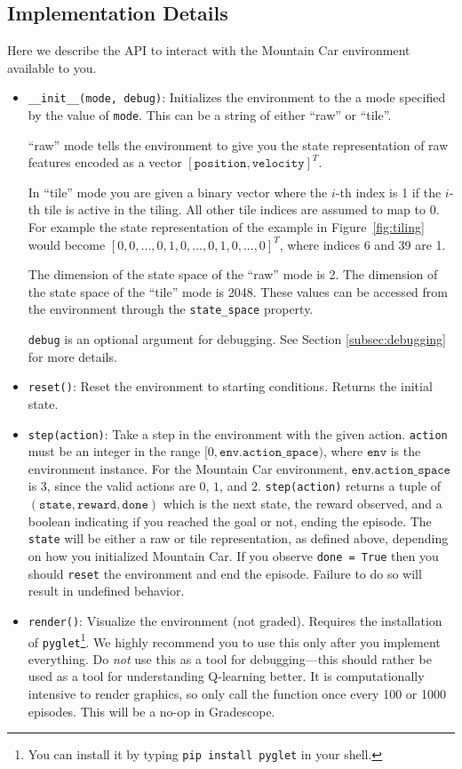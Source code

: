 \documentclass[11pt,addpoints,answers]{exam}
\begin{document}
\subsection{Implementation Details}
Here we describe the API to interact with the Mountain Car environment available to you.

\begin{itemize}
    \item \texttt{\_\_init\_\_(mode, debug)}: Initializes the environment to the a mode specified by the value of \texttt{mode}. This can be a string of either ``raw'' or ``tile''. 
    
    ``raw'' mode tells the environment to give you the state representation of raw features encoded as a vector $[\texttt{position}, \texttt{velocity}]^T$.
    
    In ``tile'' mode you are given a binary vector where the $i$-th index is 1 if the $i$-th tile is active in the tiling. All other tile indices are assumed to map to 0. For example the state representation of the example in Figure~\ref{fig:tiling} would become $[0, 0, ..., 0, 1, 0, ..., 0, 1, 0, ..., 0]^T$, where indices 6 and 39 are 1.
    
    The dimension of the state space of the ``raw'' mode is 2. The dimension of the state space of the ``tile'' mode is 2048. These values can be accessed from the environment through the \texttt{state\_space} property.
    
    \texttt{debug} is an optional argument for debugging. See Section \ref{subsec:debugging} for more details.
    
    \item \texttt{reset()}: Reset the environment to starting conditions. Returns the initial state.
        \item \texttt{step(action)}: Take a step in the environment with the given action. \texttt{action} must be an integer in the range $[0, \texttt{env.action\_space})$, where $\texttt{env}$ is the environment instance. For the Mountain Car environment, $\texttt{env.action\_space}$ is 3, since the valid actions are $0$, $1$, and $2$. \texttt{step(action)} returns a tuple of $(\texttt{state}, \texttt{reward}, \texttt{done})$ which is the next state, the reward observed, and a boolean indicating if you reached the goal or not, ending the episode. The \texttt{state} will be either a raw or tile representation, as defined above, depending on how you initialized Mountain Car.  If you observe \texttt{done = True} then you should \texttt{reset} the environment and end the episode. Failure to do so will result in undefined behavior.
    \item \texttt{render()}: Visualize the environment (not graded). Requires the installation of \texttt{pyglet}\footnote{You can install it by typing \texttt{pip install pyglet} in your shell.}. We highly recommend you to use this only after you implement everything. Do \emph{not} use this as a tool for debugging---this should rather be used as a tool for understanding Q-learning better. It is computationally intensive to render graphics, so only call the function once every 100 or 1000 episodes. This will be a no-op in Gradescope.
\end{itemize}
\end{document}
